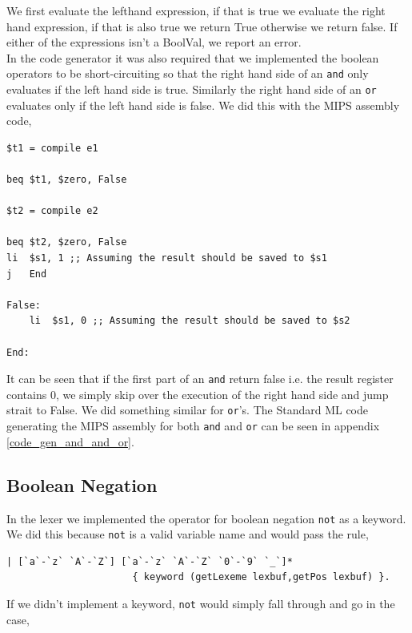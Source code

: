 \documentclass[11pt]{article}
\begin{document}
    We first evaluate the lefthand expression, if that is true we evaluate the
    right hand expression, if that is also true we return True otherwise we
    return false.  If either of the expressions isn't a BoolVal, we report an
    error. \\

    In the code generator it was also required that we implemented the boolean
    operators to be short-circuiting so that the right hand side of an
    \texttt{and} only evaluates if the left hand side is true.  Similarly the
    right hand side of an \texttt{or} evaluates only if the left hand side is
    false.  We did this with the MIPS assembly code,

    \begin{lstlisting}[]
$t1 = compile e1

beq $t1, $zero, False

$t2 = compile e2

beq $t2, $zero, False
li  $s1, 1 ;; Assuming the result should be saved to $s1
j   End

False:
    li  $s1, 0 ;; Assuming the result should be saved to $s2

End:
    \end{lstlisting}

    It can be seen that if the first part of an \texttt{and} return false i.e.
    the result register contains 0, we simply skip over the execution of the
    right hand side and jump strait to False.  We did something similar for
    \texttt{or}'s.  The Standard ML code generating the MIPS assembly for both
    \texttt{and} and \texttt{or} can be seen in appendix
    \ref{code_gen_and_and_or}.

    \subsection{Boolean Negation}
    In the lexer we implemented the operator for boolean negation \texttt{not}
    as a keyword.  We did this because \texttt{not} is a valid variable name and
    would pass the rule,

    \begin{lstlisting}[firstnumber=69]
| [`a`-`z` `A`-`Z`] [`a`-`z` `A`-`Z` `0`-`9` `_`]*
                      { keyword (getLexeme lexbuf,getPos lexbuf) }.
    \end{lstlisting}

    If we didn't implement a keyword, \texttt{not} would simply fall through and
    go in the case,
\end{document}

